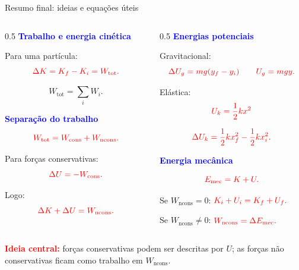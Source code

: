 \documentclass{beamer}
\begin{document}
	\begin{frame}{Resumo final: ideias e equações úteis}
		\scriptsize
		
		\begin{columns}[T]
			\begin{column}{0.5\textwidth}
				\textcolor{blue}{\textbf{Trabalho e energia cinética}}
				
				Para uma partícula:
				\[
				\textcolor{red}{\Delta K=K_f-K_i=W_{\text{tot}}.}
				\]
				
				\[
				W_{\text{tot}}=\sum_i W_i.
				\]
				
				\textcolor{blue}{\textbf{Separação do trabalho}}
				
				\[
				\textcolor{red}{W_{\text{tot}}=W_{\text{cons}}+W_{\text{ncons}}.}
				\]
				
				Para forças conservativas:
				\[
				\textcolor{red}{\Delta U=-W_{\text{cons}}.}
				\]
				
				Logo:
				\[
				\textcolor{red}{\Delta K+\Delta U=W_{\text{ncons}}.}
				\]
			\end{column}
			
			\begin{column}{0.5\textwidth}
				\textcolor{blue}{\textbf{Energias potenciais}}
				
				Gravitacional:
				\[
				\textcolor{red}{\Delta U_g=mg(y_f-y_i)}
				\qquad
				\textcolor{red}{U_g=mgy.}
				\]
				
				Elástica:
				\[
				\textcolor{red}{U_k=\frac12kx^2}
				\]
				
				\[
				\textcolor{red}{\Delta U_k
					=\frac12kx_f^2-\frac12kx_i^2.}
				\]
				
				\textcolor{blue}{\textbf{Energia mecânica}}
				
				\[
				\textcolor{red}{E_{\text{mec}}=K+U.}
				\]
				
				Se \(W_{\text{ncons}}=0\):
				$
				\textcolor{red}{K_i+U_i=K_f+U_f.}
				$
				
				\vspace{0.4cm}
				
				Se \(W_{\text{ncons}}\neq0\):
				$
				\textcolor{red}{W_{\text{ncons}}=\Delta E_{\text{mec}}.}
				$
			\end{column}
		\end{columns}
		
		\vspace{0.4cm}
		\centering
		\textcolor{red}{\textbf{Ideia central:}} forças conservativas podem ser descritas por \(U\); as forças não conservativas ficam como trabalho em \(W_{\text{ncons}}\).
		
	\end{frame}
	
\end{document}
